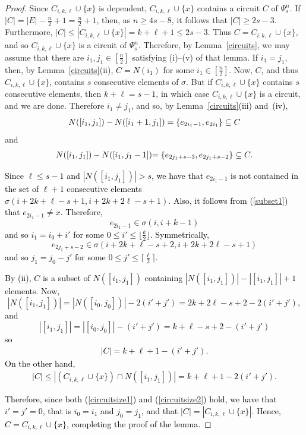 \documentclass[11pt]{amsart}
\newcommand{\bloo}{\textcolor{black}}
\begin{document}
\begin{proof}
Since $C_{i, k, \ell}\cup \{x\}$ is dependent, $C_{i, k, \ell}\cup \{x\}$ contains a circuit $C$ of $\Psi^n_s$. If $|C|=|E|-\frac{n}{2}+1=\frac{n}{2}+1$, then, as $n \geq 4s-8$, it follows that $|C| \geq 2s-3$. Furthermore, $|C| \leq |C_{i, k, \ell}\cup \{x\}| = k+\ell+1 \leq 2s-3$. Thus $C=C_{i, k, \ell}\cup \{x\}$, and so $C_{i, k, \ell}\cup \{x\}$ is a circuit of $\Psi^n_s$. Therefore, by Lemma~\ref{circuits}, we may assume that there are $i_1, j_1\in [\frac{n}{2}]$ satisfying (i)--(v) of that lemma. If $i_1=j_1$, then, by Lemma~\ref{circuits}(ii), \bloo{$C=N(i_1)$} for some $i_1\in [\frac{n}{2}]$. Now, $C$, and thus $C_{i,k,\ell} \cup \{x\}$, contains $s$ consecutive elements of $\sigma$. But if $C_{i,k,\ell} \cup \{x\}$ contains $s$ consecutive elements, then $k+\ell = s-1$, in which case $C_{i,k,\ell} \cup \{x\}$ is a circuit, and we are done. Therefore $i_1\neq j_1$, and so, by Lemma~\ref{circuits}\bloo{(iii) and~(iv)},
\begin{align}\label{subset1}
N([i_1, j_1])-N([i_1+1, j_1])=\bloo{\{e_{2i_1-1},e_{2i_1}\}}\subseteq C
\end{align}
and
\begin{align}\label{subset2}
N([i_1, j_1])-N([i_1, j_1-1])\bloo{=\{e_{2j_1+s-3},e_{2j_1+s-2}\}}\subseteq C.
\end{align}

\bloo{Since $\ell \leq s-1$ and $|N([i_1,j_1])|>s$, we have that $e_{2i_1-1}$ is not contained in the set of $\ell+1$ consecutive elements $\sigma(i+2k+\ell-s+1,i+2k+2\ell-s+1)$. Also, it follows from (\ref{subset1}) that $e_{2i_1-1} \neq x$. Therefore,
\[e_{2i_1-1} \in \sigma(i,i+k-1)\]
and so $i_1 = i_0 + i'$ for some $0 \leq i' \leq \lfloor{\frac{k}{2}}\rfloor$. Symmetrically,
\[e_{2j_1+s-2} \in \sigma(i+2k+\ell-s+2,i+2k+2\ell-s+1)\]
and so $j_1 = j_0 - j'$ for some $0 \leq j' \leq \lceil{\frac{\ell}{2}}\rceil$.}

\bloo{By (ii), $C$ is a subset of $N([i_1,j_1])$ containing $\left.|N([i_1,j_1])| - |[i_1,j_1]| + 1\right.$ elements. Now,
\[|N([i_1,j_1])| = |N([i_0,j_0])| - 2(i'+j') = 2k+2\ell-s+2 - 2(i'+j'),\]
and
\[|[i_1,j_1]| = |[i_0,j_0]| - (i'+j')=k+\ell-s+2 - (i'+j')\]
so
\begin{align} \label{circuitsize1}
|C| = k+\ell+1-(i'+j').
\end{align}
On the other hand,
\begin{align} \label{circuitsize2}
|C| \leq |(C_{i,k,\ell}\cup\{x\}) \cap N([i_1,j_1])| = k+\ell+1 - 2(i'+j').
\end{align}}

\bloo{Therefore, since both (\ref{circuitsize1}) and (\ref{circuitsize2}) hold, we have that $i'=j'=0$, that is $i_0=i_1$ and $j_0=j_1$, and that $|C| = |C_{i,k,\ell}\cup\{x\}|$. Hence, $C=C_{i,k,\ell}\cup\{x\}$, completing the proof of the lemma.}
\end{proof}
\end{document}
